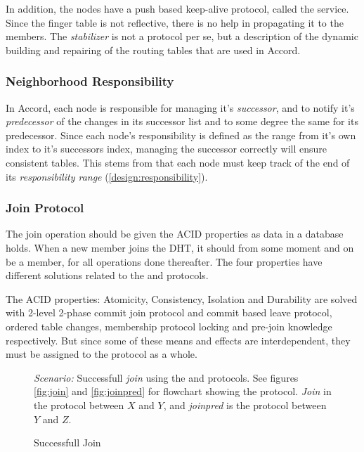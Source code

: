 In addition, the nodes have a push based keep-alive protocol, called the
  service. Since the
 finger table is not reflective, there is no help in propagating it to the
 members. The \emph{stabilizer} is not a protocol per se, but a description of the dynamic
 building and repairing of the routing tables that are used in Accord.


\subsubsection{Neighborhood Responsibility}
\label{design:neigbourhood}

In Accord, each node is responsible for managing it's \emph{successor}, and to notify
 it's \emph{predecessor} of the changes in its successor list and to some degree the
 same for its predecessor. Since each node's
 responsibility is defined as the range from it's own index to it's successors index,
 managing the successor correctly will ensure consistent tables. This stems from that
 each node must keep track of the end of its \emph{responsibility range}
 (\ref{design:responsibility}).

\subsubsection{Join Protocol}

The join operation should be given the ACID properties as data in a database holds.
 When a new member joins the DHT, it should from some moment and on be a member, for
 all operations done thereafter. The four properties have different solutions related
 to the  and  protocols.

The ACID properties: Atomicity, Consistency, Isolation and Durability are solved with
 2-level 2-phase commit join protocol and commit based leave protocol,
 ordered table changes, membership protocol locking and
 pre-join knowledge respectively. But since some of these means and effects are
 interdependent, they must be assigned to the protocol as a whole.


\begin{figure}[htp]
\centering
{}
\parbox{.9\linewidth}{
\emph{Scenario:} Successfull \emph{join} using the  and 
 protocols. See figures \ref{fig:join} and \ref{fig:joinpred} for flowchart
 showing the protocol. \emph{Join} in the protocol between $X$ and $Y$, and \emph{joinpred}
 is the protocol between $Y$ and $Z$.
}
\caption{Successfull Join}
\label{fig:join-sequence}
\end{figure}

